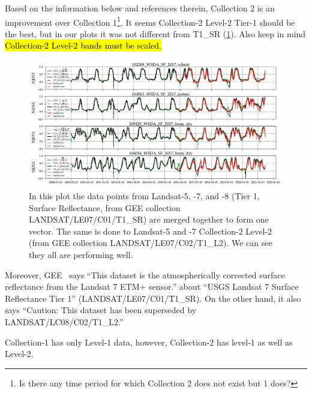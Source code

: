 Based on the information below and references therein, Collection 2 is an improvement
over Collection 1\footnote{Is there any time period for which Collection 2 
does not exist but 1 does?}.
It seems Collection-2 Level-2 Tier-1 should be the best, but
in our plots it was not different from T1\_SR (\cref{fig:C2L2Performance}). 
Also keep in mind \hl{Collection-2 Level-2 bands must be scaled.}

\begin{figure}[htb]
 \includegraphics[width=1\textwidth]{figures/00_merged_Landsats_Smoothed_and_raw}
\caption{In this plot the data points from Landsat-5, -7, and -8 (Tier 1, Surface Reflectance, from GEE collection LANDSAT/LE07/C01/T1\_SR) are merged together to form one vector. The same is done to Landsat-5 and -7 Collection-2 Level-2 (from GEE collection LANDSAT/LE07/C02/T1\_L2). We can see they all are performing well.} 
\label{fig:C2L2Performance}
\end{figure}

Moreover, GEE~\citep{Landsat7T1SRBandWidths}
says ``This dataset is the atmospherically corrected surface
reflectance from the Landsat 7 ETM+ sensor.'' about ``USGS Landsat 7 
Surface Reflectance Tier 1''  (LANDSAT/LE07/C01/T1\_SR). 
On the other hand, it also says ``Caution: 
This dataset has been superseded by LANDSAT/LC08/C02/T1\_L2.'' 

Collection-1 has only Level-1 data, however, Collection-2 has 
level-1 as well as Level-2.

